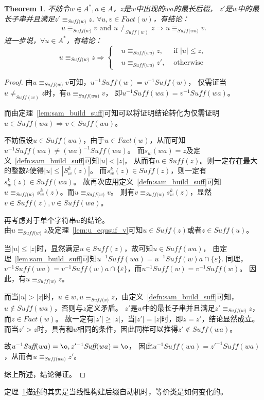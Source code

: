 \documentclass[UTF8]{ctexart}
\newtheorem{thm}{Theorem}[subsection]
\theoremstyle{definition}
\theoremstyle{remark}
\numberwithin{equation}{subsection}
\newcommand{\equsuf}[1][x]{\equiv_{\textit{Suff(#1)}}}
\newcommand{\Suff}{\textit{Suff}}
\begin{document}
	\begin{thm}
	\label{thm:sam_ec}
		不妨令$w \in A^*, a \in A$，$z$是$w$中出现的$wa$的最长后缀，
		$z'$是$w$中的最长子串并且满足$z' \equsuf[w] z$.
		$\forall u,v \in Fact(w)$，有结论：
		\[
			u \equsuf[w] v \text{ and } u \neq_{\Suff(w)} z \Longrightarrow u \equsuf[wa] v.
		\]
		进一步说，$\forall u \in A^*$，有结论：
		\[
			u \equsuf[w] z \Longrightarrow
			\left\{
				\begin{aligned}
					&u \equsuf[wa] z,	&\text{ if } |u| \le z,	\\
					&u \equsuf[wa] z',	&\text{ otherwise }
				\end{aligned}
			\right .
		\]
	\end{thm}
	\begin{proof}
		由$u \equsuf[w] v$可知，$u^{-1} \Suff(w) = v^{-1} \Suff(w)$，
		仅需证当$u \neq_{\Suff(w)} z$时，有$u \equsuf[wa] v$，
		即$u^{-1} \Suff(wa) = v^{-1} \Suff(wa)$。
		
		而由定理~\ref{lem:sam_build_suff}可知可以将证明结论转化为仅需证明
		$u \in \Suff(wa) \Longrightarrow v \in \Suff(wa)$。
		
		不妨假设$u \in \Suff(wa)$，由于$u \in Fact(w)$，从而可知$u^{-1} Suff(wa) \neq (wa)^{-1} Suff(wa)$。
		而$s_{w}(wa) = z$及定义~\ref{defn:sam_build_suff}可知$|u| < |z|$，
		从而有$u \in \Suff(z)$。则一定存在最大的整数$k$使得$|u| \le |S_w^k(z)|$。
		而$s_w^k(z) \in \Suff(z)$，则一定有$s_w^k(z) \in \Suff(wa)$。
		故再次应用定义~\ref{defn:sam_build_suff}可知$u \equsuf[w] s_w^k(z)$。而$u \equsuf[w] v$。
		则有$v \equsuf[w] s_w^k(z)$，显然$v \in \Suff(z), v \in \Suff(wa)$。
		
		再考虑对于单个字符串$u$的结论。\\
		由$u \equsuf[w] z$及定理~\ref{lem:u_equsuf_v}可知$u \in \Suff(z)$或者$z \in \Suff(u)$。
		
		当$|u| \le |z|$时，显然满足$u \in \Suff(z)$，故可知$u \in \Suff(wa)$，
		由定理~\ref{lem:sam_build_suff}可知$u^{-1} Suff(wa) = u^{-1} Suff(w)a \cap \{ \varepsilon \}$.
		同理，$v^{-1} Suff(wa) = v^{-1} Suff(w)a \cap \{ \varepsilon \}$，而$u^{-1} Suff(w) = v^{-1} Suff(w)$。
		因此，有$u \equsuf[w] z$。
		
		而当$|u| > |z|$时，$u \in w, u \equsuf z$，由定义~\ref{defn:sam_build_suff}可知，
		$u \notin \Suff(wa)$，否则与$z$定义矛盾。
		$z'$是$w$中的最长子串并且满足$z' \equsuf[w] z$，而$z \in Fact(w)$。
		故一定有$|z'| \ge |z|$，当$|z'| = |z|$时，即$z = z'$，结论显然成立。
		而当$z' > z$时，具有和$u$相同的条件，因此同样可以推得$z' \notin \Suff(wa)$。
		
		故$u^{-1} \Suff(wa) = {\o}, z'^{-1} \Suff(wa) = {\o}$，
		因此$u^{-1} \Suff(wa) = z'^{-1} \Suff(wa)$，从而有$u \equsuf[wa] z'$。
		
		综上所述，结论得证。
	\end{proof}
	定理~\ref{thm:sam_ec}描述的其实是当线性构建后缀自动机时，等价类是如何变化的。
	
\end{document}
